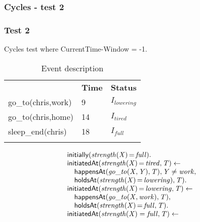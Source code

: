 \documentclass[8pt]{beamer}
\DeclareMathOperator{\val}{=}  %
\def \patsize {}
\def\happensAt{\textsf{\patsize happensAt}}
\def\initially{\textsf{\patsize initially}}
\def\holdsAt{\textsf{\patsize holdsAt}}
\def\initiatedAt{\textsf{\patsize initiatedAt}}
\newenvironment{mysplit}%
  {\arraycolsep 0pt \begin{array}{l}}%
  {\end{array}}
\begin{document}
\begin{frame}
    \frametitle{Cycles - test 2}
    \subsubsection{Test 2}
    \small
    Cycles test where CurrentTime-Window = -1.\linebreak
    \begin{minipage}{0.4\linewidth}
        \begin{table}[t!]
            \caption{Event description}
            \begin{center}

                \begin{tabular}{lll}
                    \hline\noalign{\smallskip}
                    \multicolumn{1}{l}{\textbf{Event}} & \multicolumn{1}{c}{\textbf{Time}} & \multicolumn{1}{c}{\textbf{Status}} \\
                    go\_to(chris,work)& 9 & $I_{lowering}$\\
                    go\_to(chris,home)& 14 & $I_{tired}$\\
                    sleep\_end(chris)& 18 & $I_{full}$\\
                    \noalign{\smallskip}
                    \hline
                \end{tabular}
            \end{center}
        \end{table}
    \end{minipage}
    \begin{minipage}{0.55\linewidth}
        \begin{align*}
            \begin{mysplit}
                \initially\mathit{(strength(X)\val full)}.\\
                \initiatedAt\mathit{(strength(X)\val tired,T)\leftarrow}\\
                \quad    \happensAt\mathit{(go\_to(X,Y),T),Y\neq work,}\\
                \quad    \holdsAt\mathit{(strength(X)\val lowering),T).}\\
                \initiatedAt\mathit{(strength(X)\val lowering,T)\leftarrow}\\
                \quad    \happensAt\mathit{(go\_to(X,work),T),}\\
                \quad    \holdsAt\mathit{(strength(X)\val full,T).}\\
                \initiatedAt\mathit{(strength(X)=full,T)\leftarrow}\\

\end{mysplit}
\end{align*}
\end{minipage}
\end{frame}
\end{document}
